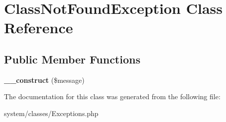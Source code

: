 \hypertarget{class_class_not_found_exception}{
\section{ClassNotFoundException Class Reference}
\label{class_class_not_found_exception}
}
\subsection*{Public Member Functions}
\begin{DoxyCompactItemize}
\item 
\hypertarget{class_class_not_found_exception_a7c00c6a4981f55404b49962a66b0746a}{
{\bfseries \_\-\_\-construct} (\$message)}
\label{class_class_not_found_exception_a7c00c6a4981f55404b49962a66b0746a}

\end{DoxyCompactItemize}


The documentation for this class was generated from the following file:\begin{DoxyCompactItemize}
\item 
system/classes/Exceptions.php\end{DoxyCompactItemize}
